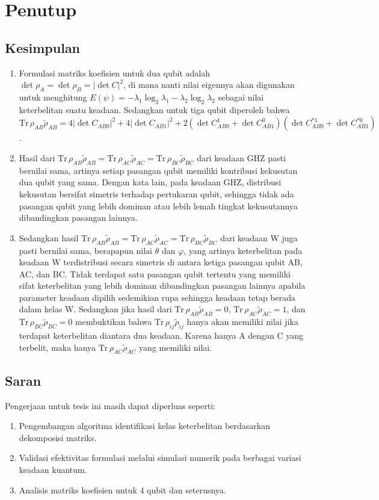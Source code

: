\chapter{Penutup}
\section{Kesimpulan}
\begin{enumerate}
	\item Formulasi matriks koefisien untuk dua qubit adalah $\det \rho_A = \det \rho_B = |\det C|^2$, di mana nanti nilai eigennya akan digunakan untuk menghitung $E(\psi)=-\lambda_1\log_2\lambda_1-\lambda_2\log_2\lambda_2$ sebagai nilai keterbelitan suatu keadaan. Sedangkan untuk tiga qubit diperoleh bahwa $\mathrm{Tr}\,\rho_{AB} \tilde{\rho}_{AB}= 4 |\det C_{AB0}|^2 + 4 |\det C_{AB1}|^2 + 2 (\det C_{AB0}^1 + \det C_{AB1}^0)(\det C^{*1}_{AB0} + \det C^{*0}_{AB1})$.
	\item Hasil dari $\mathrm{Tr}\,\rho_{AB}\tilde{\rho}_{AB}=\mathrm{Tr}\,\rho_{AC}\tilde{\rho}_{AC}=\mathrm{Tr}\,\rho_{BC}\tilde{\rho}_{BC}$ dari keadaan GHZ pasti bernilai sama, artinya setiap pasangan qubit memiliki kontribusi kekusutan dua qubit yang sama. Dengan kata lain, pada keadaan GHZ, distribusi kekusutan bersifat simetris terhadap pertukaran qubit, sehingga tidak ada pasangan qubit yang lebih dominan atau lebih lemah tingkat kekusutannya dibandingkan pasangan lainnya.
	\item Sedangkan hasil $\mathrm{Tr}\,\rho_{AB}\tilde{\rho}_{AB}=\mathrm{Tr}\,\rho_{AC}\tilde{\rho}_{AC}=\mathrm{Tr}\,\rho_{BC}\tilde{\rho}_{BC}$ dari keadaan W juga pasti bernilai sama, berapapun nilai $\theta$ dan $\varphi$, yang artinya keterbelitan pada keadaan W terdistribusi secara simetris di antara ketiga pasangan qubit AB, AC, dan BC. Tidak terdapat satu pasangan qubit tertentu yang memiliki sifat keterbelitan yang lebih dominan dibandingkan pasangan lainnya apabila parameter keadaan dipilih sedemikian rupa sehingga keadaan tetap berada dalam kelas W. Sedangkan jika hasil dari $\mathrm{Tr}\,\rho_{AB}\tilde{\rho}_{AB}=0$, $\mathrm{Tr}\,\rho_{AC}\tilde{\rho}_{AC}=1$, dan $\mathrm{Tr}\,\rho_{BC}\tilde{\rho}_{BC}=0$ membuktikan bahwa $\mathrm{Tr}\,\rho_{ij}\tilde{\rho}_{ij}$ hanya akan memiliki nilai jika terdapat keterbelitan diantara dua keadaan. Karena hanya A dengan C yang terbelit, maka hanya $\mathrm{Tr}\,\rho_{AC}\tilde{\rho}_{AC}$ yang memiliki nilai.
\end{enumerate}
\section{Saran}
Pengerjaan untuk tesis ini masih dapat diperluas seperti:
\begin{enumerate}
	\item Pengembangan algoritma identifikasi kelas keterbelitan berdasarkan dekomposisi matriks.
	\item Validasi efektivitas formulasi melalui simulasi numerik pada berbagai variasi keadaan kuantum.
	\item Analisis matriks koefisien untuk 4 qubit dan seterusnya.
\end{enumerate}

